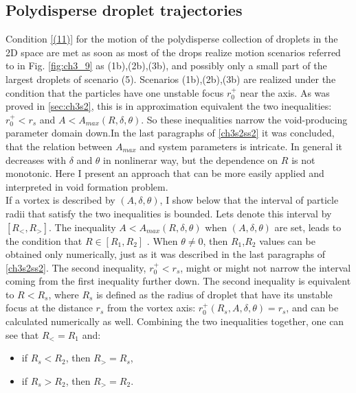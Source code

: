 \documentclass[../main.tex]{subfiles}
\begin{document}
\subsection{Polydisperse droplet trajectories}
\label{ssec:poly}

Condition \ref{(11)} for the motion of the polydisperse collection of droplets in the 2D space are met as soon as most of the drops realize motion scenarios referred to in Fig. \autoref{fig:ch3_9} as (1b),(2b),(3b), and possibly only a small part of the largest droplets of scenario (5). Scenarios (1b),(2b),(3b) are realized under the condition that the particles have one unstable focus $r^+_0$ near the axis. As was proved in \autoref{sec:ch3s2}, this is in approximation equivalent the two inequalities: $r^+_0<r_s$ and $A<A_{max}(R,\delta,\theta)$. So these inequalities narrow the void-producing parameter domain down.In the last paragraphs of \autoref{ch3s2ss2} it was concluded, that the relation between $A_{max}$ and system parameters is intricate. In general it decreases with $\delta$ and $\theta$ in nonlinerar way, but the dependence on $R$ is not monotonic. Here I present an approach that can be more easily applied and interpreted in void formation problem.\\
If a vortex is described by $(A, \delta, \theta)$, I show below that the interval of particle radii that satisfy the two inequalities is bounded. Lets denote this interval by $[R_<,R_>]$.
The inequality $A<A_{max}(R,\delta,\theta)$ when $(A, \delta, \theta)$ are set, leads to the condition that $R  \in [R_1,R_2]$ . When $\theta \neq 0 $, then $R_1$,$R_2$ values can be obtained only numerically, just as it was described in the last paragraphs of \autoref{ch3s2ss2}.
The second inequality, $r^+_0<r_s$, might or might not narrow the interval coming from the first inequality further down. The second inequality is equivalent to $R<R_s$, where $R_s$ is defined as the radius of droplet that have its unstable focus at the distance $r_s$ from the vortex axis: $r^+_0(R_s,A,\delta,\theta)=r_s$, and can be calculated numerically as well. Combining the two inequalities together, one can see that $R_<=R_1$ and:
\begin{itemize}
\item if $R_s<R_2$, then  $R_>=R_s$,
\item if $R_s>R_2$, then $R_>=R_2$.
\end{itemize}
\end{document}
